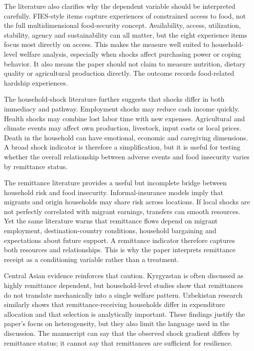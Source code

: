 \documentclass[11pt]{article}
\begin{document}
The literature also clarifies why the dependent variable should be interpreted carefully. FIES-style items capture experiences of constrained access to food, not the full multidimensional food-security concept. Availability, access, utilization, stability, agency and sustainability can all matter, but the eight experience items focus most directly on access. This makes the measure well suited to household-level welfare analysis, especially when shocks affect purchasing power or coping behavior. It also means the paper should not claim to measure nutrition, dietary quality or agricultural production directly. The outcome records food-related hardship experiences.

The household-shock literature further suggests that shocks differ in both immediacy and pathway. Employment shocks may reduce cash income quickly. Health shocks may combine lost labor time with new expenses. Agricultural and climate events may affect own production, livestock, input costs or local prices. Death in the household can have emotional, economic and caregiving dimensions. A broad shock indicator is therefore a simplification, but it is useful for testing whether the overall relationship between adverse events and food insecurity varies by remittance status.

The remittance literature provides a useful but incomplete bridge between household risk and food insecurity. Informal-insurance models imply that migrants and origin households may share risk across locations. If local shocks are not perfectly correlated with migrant earnings, transfers can smooth resources. Yet the same literature warns that remittance flows depend on migrant employment, destination-country conditions, household bargaining and expectations about future support. A remittance indicator therefore captures both resources and relationships. This is why the paper interprets remittance receipt as a conditioning variable rather than a treatment.

Central Asian evidence reinforces that caution. Kyrgyzstan is often discussed as highly remittance dependent, but household-level studies show that remittances do not translate mechanically into a single welfare pattern. Uzbekistan research similarly shows that remittance-receiving households differ in expenditure allocation and that selection is analytically important. These findings justify the paper's focus on heterogeneity, but they also limit the language used in the discussion. The manuscript can say that the observed shock gradient differs by remittance status; it cannot say that remittances are sufficient for resilience.
\end{document}
